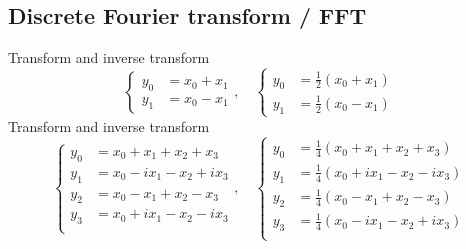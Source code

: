 \documentclass[12pt]{article}
\begin{document}
\subsection*{Discrete Fourier transform / FFT}

Transform and inverse transform
$$
\begin{cases}
y_0&=x_0+x_1\\
y_1&=x_0-x_1
\end{cases},\quad
\begin{cases}
y_0&=\frac{1}{2}(x_0+x_1)\\
y_1&=\frac{1}{2}(x_0-x_1)
\end{cases}
$$
Transform and inverse transform
$$
\begin{cases}
y_0&=x_0+x_1+x_2+x_3\\
y_1&=x_0-ix_1-x_2+ix_3\\
y_2&=x_0-x_1+x_2-x_3\\
y_3&=x_0+ix_1-x_2-ix_3\\
\end{cases},\quad
\begin{cases}
y_0&=\frac{1}{4}(x_0+x_1+x_2+x_3)\\
y_1&=\frac{1}{4}(x_0+ix_1-x_2-ix_3)\\
y_2&=\frac{1}{4}(x_0-x_1+x_2-x_3)\\
y_3&=\frac{1}{4}(x_0-ix_1-x_2+ix_3)\\
\end{cases}
$$
\end{document}
